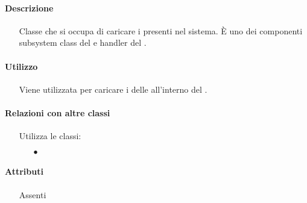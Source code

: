 \paragraph*{Descrizione}
\begin{itemize}
\item[] Classe che si occupa di caricare i  presenti nel sistema. È uno dei componenti subsystem class del   e handler del  .
\end{itemize}

\paragraph*{Utilizzo}
\begin{itemize}
\item[] Viene utilizzata per caricare i  delle  all'interno del .
\end{itemize}

\paragraph*{Relazioni con altre classi}
\begin{itemize}


\item[] Utilizza le classi:
\begin{itemize}
\item[$\bullet$] 
\end{itemize}
\end{itemize}

\paragraph*{Attributi}
\begin{itemize}
\item[] Assenti
\end{itemize}

